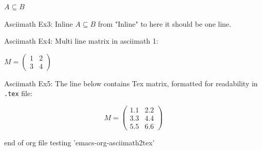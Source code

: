 \documentclass[11pt]{article}
\begin{document}
\(A \subseteq B\)

Asciimath Ex3: Inline \(A \subseteq B\) from "Inline" to here it should be one line.

Asciimath Ex4: Multi line matrix in asciimath 1:

\(M = \left ( \begin{matrix} 1 & 2 \\ 3 & 4 \end{matrix} \right )\)


Asciimath Ex5: The line below contains Tex matrix, formatted for readability in \texttt{.tex} file:

$$M = \left ( \begin{matrix}
1.1 & 2.2 \\
3.3 & 4.4 \\
5.5 & 6.6
\end{matrix} \right )$$


end of org file testing 'emacs-org-asciimath2tex'
\end{document}
